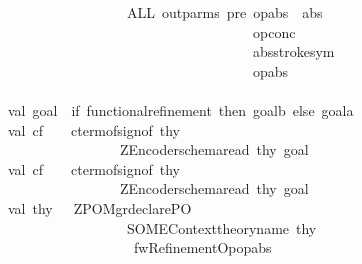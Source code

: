 \begin{isabellebody}
\ \ \ \ \ \ \ \ \ \ \ \ \ \ \ \ \ \ \ \ \ \ \ \ \ \ \ \ {\isacharparenleft}ALL\ out{\isacharunderscore}parms\ {\isacharparenleft}{\isachardoublequote}pre\ {\isachardoublequote}{\isacharcircum}op{\isacharunderscore}abs{\isacharcircum}{\isachardoublequote}\ {\isasymand}\ {\isachardoublequote}{\isacharcircum}abs{\isacharcircum}\isanewline
\ \ \ \ \ \ \ \ \ \ \ \ \ \ \ \ \ \ \ \ \ \ \ \ \ \ \ \ \ \ \ \ \ \ \ \ \ \ \ \ \ \ \ \ {\isachardoublequote}\ {\isasymand}\ {\isachardoublequote}{\isacharcircum}op{\isacharunderscore}conc{\isacharcircum}\ \isanewline
\ \ \ \ \ \ \ \ \ \ \ \ \ \ \ \ \ \ \ \ \ \ \ \ \ \ \ \ \ \ \ \ \ \ \ \ \ \ \ \ \ \ \ \ {\isachardoublequote}\ {\isasymand}\ {\isachardoublequote}{\isacharcircum}abs{\isacharcircum}stroke{\isacharunderscore}sym{\isacharcircum}\isanewline
\ \ \ \ \ \ \ \ \ \ \ \ \ \ \ \ \ \ \ \ \ \ \ \ \ \ \ \ \ \ \ \ \ \ \ \ \ \ \ \ \ \ \ \ {\isachardoublequote}\ {\isasymlongrightarrow}\ {\isachardoublequote}{\isacharcircum}op{\isacharunderscore}abs\isanewline
\ \ \ \ \ \ \ \ \ \ \ \ \ \ \ \ \ \ \ \ \ \ \ \ \ \ \ \ \ \ \ \ \ \ \ \ \ \ \ \ \ \ \ \ {\isacharparenright}{\isacharparenright}{\isacharparenright}{\isacharcircum}{\isachardoublequote}{\isacharparenright}{\isacharparenright}{\isacharparenright}{\isachardoublequote}\ \isanewline
\ \ \ \ \ \ \ \ \ \ \ val\ goal{}\ {\isacharequal}\ if\ functional{\isacharunderscore}refinement\ then\ goal{}b\ else\ goal{}a\isanewline
\ \ \ \ \ \ \ \ \ \ \ val\ cf{}\ \ \ {\isacharequal}\ cterm{\isacharunderscore}of{\isacharparenleft}sign{\isacharunderscore}of\ thy{\isacharparenright}\isanewline
\ \ \ \ \ \ \ \ \ \ \ \ \ \ \ \ \ \ \ \ \ \ \ \ \ \ \ {\isacharparenleft}ZEncoder{\isachardot}schema{\isacharunderscore}read\ thy\ goal{}{\isacharparenright}\isanewline
\ \ \ \ \ \ \ \ \ \ \ val\ cf{}\ \ \ {\isacharequal}\ cterm{\isacharunderscore}of{\isacharparenleft}sign{\isacharunderscore}of\ thy{\isacharparenright}\isanewline
\ \ \ \ \ \ \ \ \ \ \ \ \ \ \ \ \ \ \ \ \ \ \ \ \ \ \ {\isacharparenleft}ZEncoder{\isachardot}schema{\isacharunderscore}read\ thy\ goal{}{\isacharparenright}\isanewline
\ \ \ \ \ \ \ \ \ \ \ val\ thy{\isacharprime}\ \ {\isacharequal}\ ZPO{\isacharunderscore}Mgr{\isachardot}declare{\isacharunderscore}PO\ \isanewline
\ \ \ \ \ \ \ \ \ \ \ \ \ \ \ \ \ \ \ \ \ \ \ \ \ \ \ \ {\isacharparenleft}SOME{\isacharparenleft}Context{\isachardot}theory{\isacharunderscore}name\ thy{\isacharparenright}{\isacharcomma}\isanewline
\ \ \ \ \ \ \ \ \ \ \ \ \ \ \ \ \ \ \ \ \ \ \ \ \ \ \ \ \ {\isachardoublequote}fwRefinementOp{\isachardoublequote}{\isacharcomma}op{\isacharunderscore}abs{\isacharparenright}\ \isanewline

\end{isabellebody}
